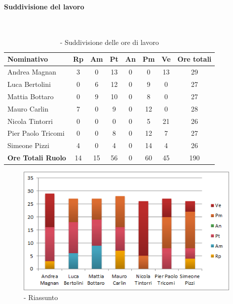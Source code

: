 \documentclass[../PianoDiProgetto.tex]{subfiles}
\begin{document}
	\subsubsection{\PerC}
				\paragraph{Suddivisione del lavoro}\
						
	\begin{table}[H]
		\begin{tabularx}{\textwidth}{l  * {6}{c}  c}
			\toprule
			\textbf{Nominativo} & \textbf{Rp} & \textbf{Am} & \textbf{Pt} 
						& \textbf{An} & \textbf{Pm} & \textbf{Ve} & \textbf{Ore totali} \\
			\midrule
			Andrea Magnan  & 3 & 0 & 13 & 0 & 0 & 13 & 29 \\
			Luca Bertolini  & 0 & 6 & 12 & 0 & 9 & 0 & 27 \\
			Mattia Bottaro  & 0 & 9 & 10 & 0 & 8 & 0 & 27 \\
			Mauro Carlin  & 7 & 0 & 9 & 0 & 12 & 0 & 28 \\
			Nicola Tintorri  & 0 & 0 & 0 & 0 & 5 & 21 & 26 \\
			Pier Paolo Tricomi  & 0 & 0 & 8 & 0 & 12 & 7 & 27 \\
			Simeone Pizzi & 4 & 0 & 4 & 0 & 14 & 4 & 26 \\
			\midrule
			\textbf{Ore Totali Ruolo} & 14 & 15 & 56 & 0 & 60 & 45 & 190 \\
			\bottomrule
			
		\end{tabularx}
		\caption{\PerC{} - Suddivisione delle ore di lavoro}
	\end{table}
	
\vfill	
		
	\begin{figure}[H]
		\centering
		\includegraphics[width=11cm, trim=1cm 0cm 1cm 0cm]{grafici/C-persona}
			\caption{\PerC{}- Riassunto}
	\end{figure}
\vfill	
	
\end{document}
